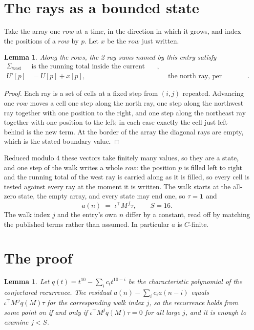\documentclass[11pt,a4paper]{article}
\theoremstyle{plain}
\newtheorem{lemma}[theorem]{Lemma}
\theoremstyle{definition}
\begin{document}
\section{The rays as a bounded state}

Take the array one $row$ at a time, in the direction in which it grows, and index the
positions of a $row $ by $p$. Let $x$ be the $row$ just written.

\begin{lemma}\label{lem:rays}
Along the $row$s, the 2 ray sums named by this entry satisfy
\[
\begin{aligned}
\Sigma_{\mathrm{west}}\ &\text{is the running total inside the current row},\\
U'[p]&=U[p]+x[p], &&\text{the north ray, per position} .
\end{aligned}
\]
\end{lemma}

\begin{proof}
Each ray is a set of cells at a fixed step from $(i,j)$ repeated. Advancing one $row$
moves a cell one step along the north ray, one step along the northwest ray together with one
position to the right, and one step along the northeast ray together with one position to the
left; in each case exactly the cell just left behind is the new term. At the border of the
array the diagonal rays are empty, which is the stated boundary value.
\end{proof}

Reduced modulo $4$ these vectors take finitely many values, so they are a state, and one step
of the walk writes a whole $row$: the position $p$ is filled left to right and the
running total of the west ray is carried along as it is filled, so every cell is tested
against every ray at the moment it is written. The walk starts at the all-zero state, the empty
array, and every state may end one, so $\tau=\mathbf{1}$ and
\[
a(n)\;=\;\iota^{\!\top}M^{\,j}\tau ,\qquad S=16.
\]
The walk index $j$ and the entry's own $n$ differ by a constant, read off by matching the
published terms rather than assumed. In particular $a$ is $C$-finite.

\section{The proof}

\begin{lemma}\label{lem:crit}
Let $q(t)=t^{10}-\sum_i c_it^{10-i}$ be the characteristic polynomial of the
conjectured recurrence. The residual $a(n)-\sum_ic_ia(n-i)$ equals
$\iota^{\!\top}M^{\,j}q(M)\tau$ for the corresponding walk index $j$, so the recurrence
holds from some point on if and only if $\iota^{\!\top}M^{j}q(M)\tau=0$ for all large $j$,
and it is enough to examine $j<S$.
\end{lemma}
\end{document}
